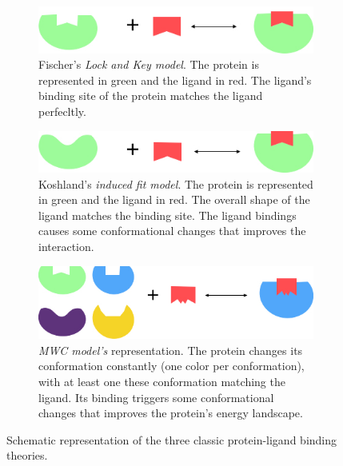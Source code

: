 \documentclass[11pt, b5paper,twoside]{tesi_upf}
\begin{document}
\begin{figure}[htbp]
  
  \centering
    \begin{subfigure}[b]{0.75\textwidth}
	\includegraphics[width=1\linewidth]{../figures/lock_key_model.jpg}
	\caption{Fischer's \textit{Lock and Key model}. The protein is represented in green and the ligand in red. The ligand's binding site of the protein matches the ligand perfecltly.}
	\label{fig:lock_and_key_model}
	\vspace*{4mm}
	\end{subfigure}
	\begin{subfigure}[b]{0.75\textwidth}
	\includegraphics[width=1\linewidth]{../figures/induce_fit_model.jpg}
	\caption{Koshland's \textit{induced fit model}. The protein is represented in green and the ligand in red. The overall shape of the ligand matches the binding site. The ligand bindings causes some conformational changes that improves the interaction.}
	\label{fig:induced_fit_model}
	\vspace*{4mm}
	\end{subfigure}
	\begin{subfigure}[b]{0.75\textwidth}
	\includegraphics[width=1\linewidth]{../figures/mwc_model.jpg}
	\caption{\textit{MWC model's} representation. The protein changes its conformation constantly (one color per conformation), with at least one these conformation matching the ligand. Its binding triggers some conformational changes that improves the protein's energy landscape.}
	\label{fig:mwc_model}
	\vspace*{4mm}
	\end{subfigure}
   \caption[Schematic representation of the three classic protein-ligand binding theories.]{Schematic representation of the three classic protein-ligand binding theories.}

\end{figure}
\end{document}
